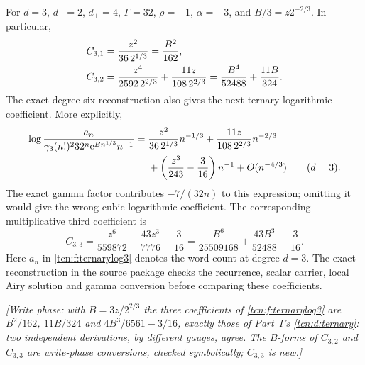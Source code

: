 \documentclass[11pt,letterpaper]{article}
\newcommand{\ee}{\mathrm e}
\theoremstyle{remark}
\begin{document}
For $d=3$, $d_-=2$, $d_+=4$, $\Gamma=32$, $\rho=-1$, $\alpha=-3$, and $B/3=z2^{-2/3}$. In particular,
\begin{align}
 C_{3,1}&=\frac{z^2}{36\,2^{1/3}}=\frac{B^2}{162},\notag\\
 C_{3,2}&=\frac{z^4}{2592\,2^{2/3}}
          +\frac{11z}{108\,2^{2/3}}=\frac{B^4}{52488}+\frac{11B}{324}.\label{tcn:f:ternarycoeffs}
\end{align}
The exact degree-six reconstruction also gives the next ternary logarithmic coefficient. More explicitly,
\begin{align}
 \log\frac{a_n}{\gamma_3(n!)^2 32^n
 \ee^{Bn^{1/3}}n^{-1}}
 ={}&\frac{z^2}{36\,2^{1/3}}n^{-1/3}
 +\frac{11z}{108\,2^{2/3}}n^{-2/3}\notag\\
 &+\left(\frac{z^3}{243}-\frac3{16}\right)n^{-1}
 +O(n^{-4/3})\qquad(d=3).\label{tcn:f:ternarylog3}
\end{align}
The exact gamma factor contributes $-7/(32n)$ to this expression; omitting it would give the wrong cubic logarithmic coefficient. The corresponding multiplicative third coefficient is
\[
 C_{3,3}=\frac{z^6}{559872}+\frac{43z^3}{7776}-\frac3{16}
 =\frac{B^6}{25509168}+\frac{43B^3}{52488}-\frac3{16}.
\]
Here $a_n$ in \eqref{tcn:f:ternarylog3} denotes the word count at degree $d=3$. The exact reconstruction in the source package checks the recurrence, scalar carrier, local Airy solution and gamma conversion before comparing these coefficients.

\emph{[Write phase: with $B=3z/2^{2/3}$ the three coefficients of \eqref{tcn:f:ternarylog3} are $B^2/162$, $11B/324$ and $4B^3/6561-3/16$, exactly those of Part~I's \eqref{tcn:d:ternary}: two independent derivations, by different gauges, agree. The $B$-forms of $C_{3,2}$ and $C_{3,3}$ are write-phase conversions, checked symbolically; $C_{3,3}$ is new.]}
\end{document}
